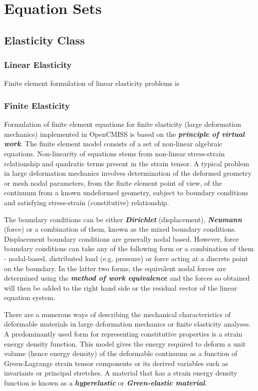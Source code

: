 \clearemptydoublepage
\chapter{Equation Sets}
\label{cha:equationsets}

\section{Elasticity Class}

\subsection{Linear Elasticity}

Finite element formulation of linear elasticity problems is

\subsection{Finite Elasticity}

Formulation of finite element equations for finite elasticity (large deformation mechanics) implemented in OpenCMISS is based on the 
\textit{\textbf{principle of virtual work}}. The finite element model consists of a set of non-linear algebraic equations. Non-linearity of 
equations stems from non-linear stress-strain relationship and quadratic terms present in the strain tensor. A typical problem in large deformation 
mechanics involves determination of the deformed geometry or mesh nodal parameters, from the finite element point of view, of the continuum 
from a known undeformed geometry, subject to boundary conditions and satisfying stress-strain (constitutive) relationship. 
  
The boundary conditions can be either \textit{\textbf{Dirichlet}} (displacement), \textit{\textbf{Neumann}} (force) or a combination of them, known 
as the mixed boundary conditions. Displacement boundary conditions are generally nodal based. However, force boundary conditions can take 
any of the following form or a combination of them - nodal-based, distributed load (e.g. pressure) or force acting at a discrete point 
on the boundary. In the latter two forms, the equivalent nodal forces are determined using the \textit{\textbf{method of work equivalence}} 
\cite{hutton:2004} and the forces so obtained will then be added to the right hand side or the residual vector of the linear equation system.  

There are a numerous ways of describing the mechanical characteristics of deformable materials in large deformation mechanics or finite elasticity
analyses. A predominantly used form for representing constitutive properties is a strain energy density function. This model gives the energy 
required to deform a unit volume (hence energy density) of the deformable continuum as a function of Green-Lagrange strain tensor components or its 
derived variables such as invariants or principal stretches. A material that has a strain energy density function is known as a 
\textit{\textbf{hyperelastic}} or \textit{\textbf{Green-elastic material}}. 


